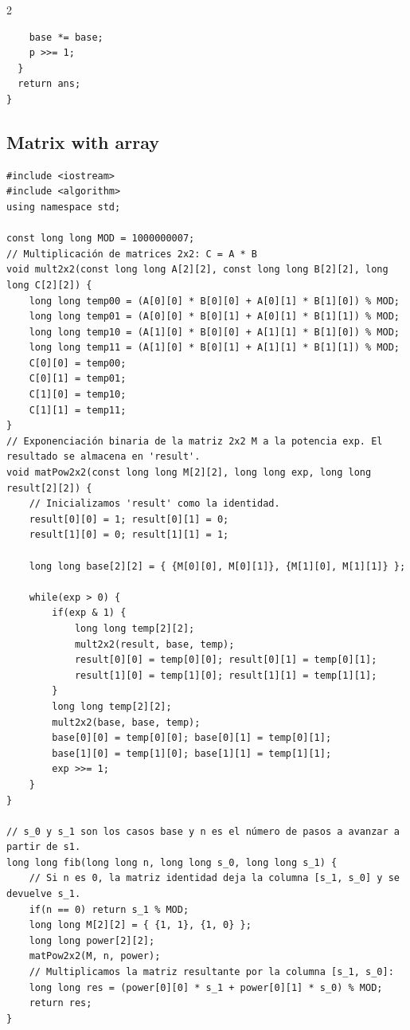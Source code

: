 \documentclass[twoside]{article}
\begin{document}
\begin{multicols*}{2}
\begin{verbatim}
    base *= base;
    p >>= 1;
  }
  return ans;
}
\end{verbatim}

	{
		\subsection*{Matrix with array}
	}
	\begin{verbatim}
#include <iostream>
#include <algorithm>
using namespace std;

const long long MOD = 1000000007;
// Multiplicación de matrices 2x2: C = A * B
void mult2x2(const long long A[2][2], const long long B[2][2], long long C[2][2]) {
    long long temp00 = (A[0][0] * B[0][0] + A[0][1] * B[1][0]) % MOD;
    long long temp01 = (A[0][0] * B[0][1] + A[0][1] * B[1][1]) % MOD;
    long long temp10 = (A[1][0] * B[0][0] + A[1][1] * B[1][0]) % MOD;
    long long temp11 = (A[1][0] * B[0][1] + A[1][1] * B[1][1]) % MOD;
    C[0][0] = temp00;
    C[0][1] = temp01;
    C[1][0] = temp10;
    C[1][1] = temp11;
}
// Exponenciación binaria de la matriz 2x2 M a la potencia exp. El resultado se almacena en 'result'.
void matPow2x2(const long long M[2][2], long long exp, long long result[2][2]) {
    // Inicializamos 'result' como la identidad.
    result[0][0] = 1; result[0][1] = 0;
    result[1][0] = 0; result[1][1] = 1;
    
    long long base[2][2] = { {M[0][0], M[0][1]}, {M[1][0], M[1][1]} };
    
    while(exp > 0) {
        if(exp & 1) {
            long long temp[2][2];
            mult2x2(result, base, temp);
            result[0][0] = temp[0][0]; result[0][1] = temp[0][1];
            result[1][0] = temp[1][0]; result[1][1] = temp[1][1];
        }
        long long temp[2][2];
        mult2x2(base, base, temp);
        base[0][0] = temp[0][0]; base[0][1] = temp[0][1];
        base[1][0] = temp[1][0]; base[1][1] = temp[1][1];
        exp >>= 1;
    }
}

// s_0 y s_1 son los casos base y n es el número de pasos a avanzar a partir de s1.
long long fib(long long n, long long s_0, long long s_1) {
    // Si n es 0, la matriz identidad deja la columna [s_1, s_0] y se devuelve s_1.
    if(n == 0) return s_1 % MOD;
    long long M[2][2] = { {1, 1}, {1, 0} };
    long long power[2][2];
    matPow2x2(M, n, power);
    // Multiplicamos la matriz resultante por la columna [s_1, s_0]:
    long long res = (power[0][0] * s_1 + power[0][1] * s_0) % MOD;
    return res;
}





\end{verbatim}
\end{multicols*}
\end{document}
